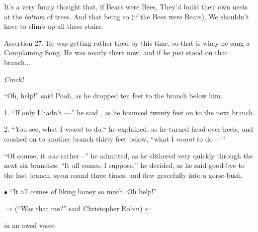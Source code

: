 {\raggedright It's a very
funny thought that, if Bears were Bees, They'd build their own nests at the {\it bottom\/ } of trees.
And that being so (if the Bees were Bears),
We shouldn't have to climb up all these stairs.
\par}

\proclaim Assertion 27. He was getting rather tired by this time, so that is
whay he sang a Complaining Song. He was nearly there now, and if he just stood
on that branch...

{\it Crack!}

``Oh, help!'' said Pooh, as he dropped ten feet to the branch below him.

\smallskip
\item{1.} ``If only I hadn't ---'' he said , as he bounced twenty feet on to the next branch.
\item{2.} ``You see, what I {\it meant} to do,`` he explained, as he turned head-over-heels, and crashed on to another branch
thirty feet below, ``what I {\it meant} to do ---''

\item{} \indent ``Of course, it {\it was} rather --'' he admitted, as he slithered very quickly through the next six branches.
 ``It all comes, I suppose,'' he decided,
 as he said good-bye to the last branch, spun round three times, and flew gracefully into a gorse-bush,
\item {$\bullet$} ``It all comes of liking honey so much. Oh help!''
\smallskip
{}
\centerline{$\Rightarrow$(``Was that me?'' said Christopher Robin)$\Leftarrow$}

in an awed voice.
\bye
